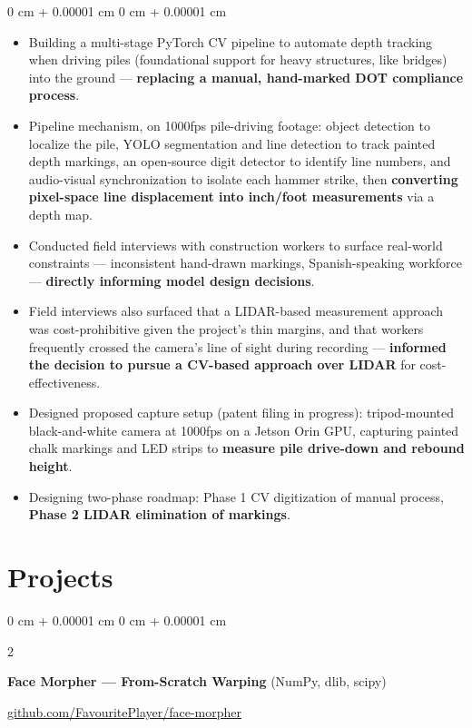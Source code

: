 \documentclass[10pt, letterpaper]{article}
\newenvironment{highlights}{
    \begin{itemize}[
        topsep=0.3 cm,
        parsep=0.05 cm,
        partopsep=0pt,
        itemsep=0.02 cm,
        leftmargin=0 cm + 10pt
    ]
}{
    \end{itemize}
} %
\newenvironment{onecolentry}{
    \begin{adjustwidth}{
        0 cm + 0.00001 cm
    }{
        0 cm + 0.00001 cm
    }
}{
    \end{adjustwidth}
} %
\newenvironment{extendedtwocolentry}[2][]{
    \onecolentry
    \def\secondColumn{#2}
    \setcolumnwidth{\fill, 8 cm}
    \begin{paracol}{2}
}{
    \switchcolumn \raggedleft \secondColumn
    \end{paracol}
    \endonecolentry
}
\begin{document}
        \vspace{0.10 cm}
        \begin{onecolentry}
            \begin{highlights}
                \item Building a multi-stage PyTorch CV pipeline to automate depth tracking when driving piles (foundational support for heavy structures, like bridges) into the ground — \textbf{replacing a manual, hand-marked DOT compliance process}.
                \item Pipeline mechanism, on 1000fps pile-driving footage: object detection to localize the pile, YOLO segmentation and line detection to track painted depth markings, an open-source digit detector to identify line numbers, and audio-visual synchronization to isolate each hammer strike, then \textbf{converting pixel-space line displacement into inch/foot measurements} via a depth map.
                \item Conducted field interviews with construction workers to surface real-world constraints — inconsistent hand-drawn markings, Spanish-speaking workforce — \textbf{directly informing model design decisions}.
                \item Field interviews also surfaced that a LIDAR-based measurement approach was cost-prohibitive given the project's thin margins, and that workers frequently crossed the camera's line of sight during recording — \textbf{informed the decision to pursue a CV-based approach over LIDAR} for cost-effectiveness.
                \item Designed proposed capture setup (patent filing in progress): tripod-mounted black-and-white camera at 1000fps on a Jetson Orin GPU, capturing painted chalk markings and LED strips to \textbf{measure pile drive-down and rebound height}.
                \item Designing two-phase roadmap: Phase 1 CV digitization of manual process, \textbf{Phase 2 LIDAR elimination of markings}.
            \end{highlights}
        \end{onecolentry}

    \section{Projects}

        \begin{extendedtwocolentry}{
            \href{https://github.com/FavouritePlayer/face-morpher}{github.com/FavouritePlayer/face-morpher}
        }
            \textbf{Face Morpher — From-Scratch Warping} (NumPy, dlib, scipy)
        \end{extendedtwocolentry}
\end{document}

